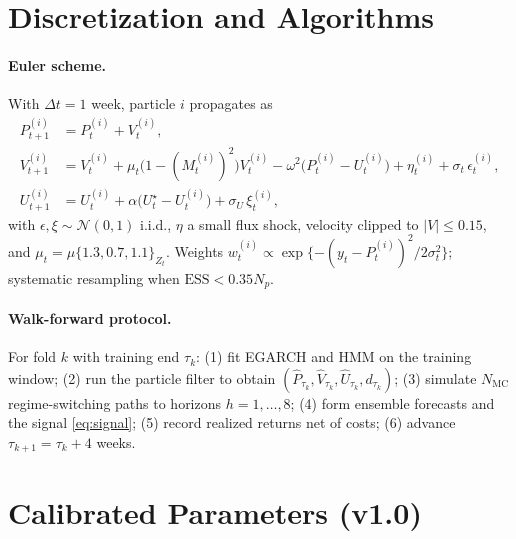 \documentclass[11pt,a4paper]{article}
\begin{document}
\appendix
\section{Discretization and Algorithms}\label{app:algo}

\paragraph{Euler scheme.} With $\Delta t = 1$ week, particle $i$ propagates as
\begin{align*}
P^{(i)}_{t+1} &= P^{(i)}_t + V^{(i)}_t,\\
V^{(i)}_{t+1} &= V^{(i)}_t + \mu_t\big(1 - (M^{(i)}_t)^2\big)V^{(i)}_t
- \omega^2\big(P^{(i)}_t - U^{(i)}_t\big) + \eta^{(i)}_t + \sigma_t\,\epsilon^{(i)}_t,\\
U^{(i)}_{t+1} &= U^{(i)}_t + \alpha\big(U^{\star}_t - U^{(i)}_t\big) + \sigma_U\,\xi^{(i)}_t,
\end{align*}
with $\epsilon, \xi \sim \mathcal{N}(0,1)$ i.i.d., $\eta$ a small flux shock, velocity clipped to $|V| \le 0.15$, and $\mu_t = \mu\{1.3, 0.7, 1.1\}_{Z_t}$. Weights $w^{(i)}_t \propto \exp\{-(y_t - P^{(i)}_t)^2 / 2\sigma_t^2\}$; systematic resampling when $\mathrm{ESS} < 0.35 N_p$.

\paragraph{Walk-forward protocol.} For fold $k$ with training end $\tau_k$: (1) fit EGARCH and HMM on the training window; (2) run the particle filter to obtain $(\hat P_{\tau_k}, \hat V_{\tau_k}, \hat U_{\tau_k}, d_{\tau_k})$; (3) simulate $N_{\mathrm{MC}}$ regime-switching paths to horizons $h = 1,\dots,8$; (4) form ensemble forecasts and the signal \eqref{eq:signal}; (5) record realized returns net of costs; (6) advance $\tau_{k+1} = \tau_k + 4$ weeks.

\section{Calibrated Parameters (v1.0)}\label{app:params}
\end{document}
